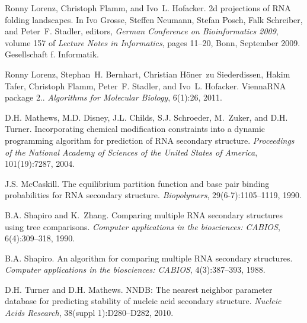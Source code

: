 \begin{DoxyDescription}
\item[\label{_CITEREF_lorenz:2009}%
\mbox{[}9\mbox{]}]Ronny Lorenz, Christoph Flamm, and Ivo~L. Hofacker. 2d projections of R\-N\-A folding landscapes. In Ivo Grosse, Steffen Neumann, Stefan Posch, Falk Schreiber, and Peter~F. Stadler, editors, {\itshape German Conference on Bioinformatics 2009}, volume 157 of {\itshape Lecture Notes in Informatics}, pages 11--20, Bonn, September 2009. Gesellschaft f. Informatik.


\item[\label{_CITEREF_lorenz:2011}%
\mbox{[}10\mbox{]}]Ronny Lorenz, Stephan~H. Bernhart, Christian H\"{o}ner~zu Siederdissen, Hakim Tafer, Christoph Flamm, Peter~F. Stadler, and Ivo~L. Hofacker. Vienna\-R\-N\-A package 2.. {\itshape Algorithms for Molecular Biology}, 6(1)\-:26, 2011. 


\item[\label{_CITEREF_mathews:2004}%
\mbox{[}11\mbox{]}]D.\-H. Mathews, M.\-D. Disney, J.\-L. Childs, S.\-J. Schroeder, M.~Zuker, and D.\-H. Turner. Incorporating chemical modification constraints into a dynamic programming algorithm for prediction of R\-N\-A secondary structure. {\itshape Proceedings of the National Academy of Sciences of the United States of America}, 101(19)\-:7287, 2004.


\item[\label{_CITEREF_mccaskill:1990}%
\mbox{[}12\mbox{]}]J.\-S. Mc\-Caskill. The equilibrium partition function and base pair binding probabilities for R\-N\-A secondary structure. {\itshape Biopolymers}, 29(6-\/7)\-:1105--1119, 1990.


\item[\label{_CITEREF_shapiro:1990}%
\mbox{[}13\mbox{]}]B.\-A. Shapiro and K.~Zhang. Comparing multiple R\-N\-A secondary structures using tree comparisons. {\itshape Computer applications in the biosciences\-: C\-A\-B\-I\-O\-S}, 6(4)\-:309--318, 1990.


\item[\label{_CITEREF_shapiro:1988}%
\mbox{[}14\mbox{]}]B.\-A. Shapiro. An algorithm for comparing multiple R\-N\-A secondary structures. {\itshape Computer applications in the biosciences\-: C\-A\-B\-I\-O\-S}, 4(3)\-:387--393, 1988.


\item[\label{_CITEREF_turner:2010}%
\mbox{[}15\mbox{]}]D.\-H. Turner and D.\-H. Mathews. N\-N\-D\-B\-: The nearest neighbor parameter database for predicting stability of nucleic acid secondary structure. {\itshape Nucleic Acids Research}, 38(suppl 1)\-:D280--D282, 2010.



\end{DoxyDescription}
